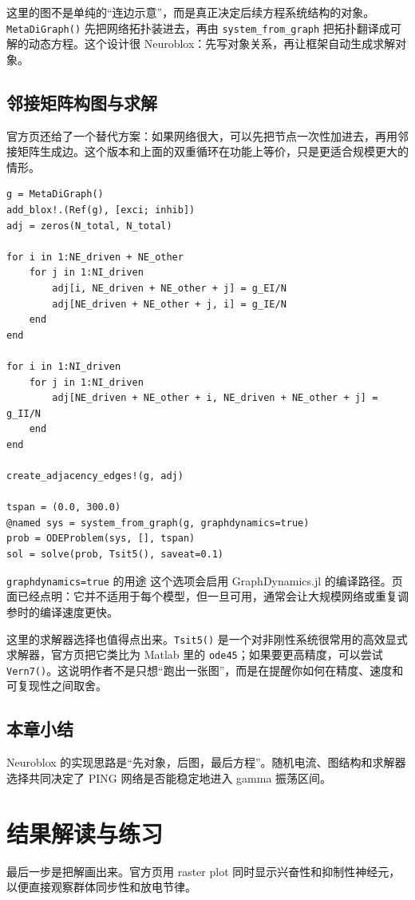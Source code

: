 \documentclass[a4paper]{article}
\begin{document}
这里的图不是单纯的“连边示意”，而是真正决定后续方程系统结构的对象。\texttt{MetaDiGraph()} 先把网络拓扑装进去，再由 \texttt{system\_from\_graph} 把拓扑翻译成可解的动态方程。这个设计很 Neuroblox：先写对象关系，再让框架自动生成求解对象。

\subsection{邻接矩阵构图与求解}
官方页还给了一个替代方案：如果网络很大，可以先把节点一次性加进去，再用邻接矩阵生成边。这个版本和上面的双重循环在功能上等价，只是更适合规模更大的情形。

\begin{lstlisting}[caption={用邻接矩阵一次性生成同样的图并求解},label={lst:ping_sim}]
g = MetaDiGraph()
add_blox!.(Ref(g), [exci; inhib])
adj = zeros(N_total, N_total)

for i in 1:NE_driven + NE_other
    for j in 1:NI_driven
        adj[i, NE_driven + NE_other + j] = g_EI/N
        adj[NE_driven + NE_other + j, i] = g_IE/N
    end
end

for i in 1:NI_driven
    for j in 1:NI_driven
        adj[NE_driven + NE_other + i, NE_driven + NE_other + j] = g_II/N
    end
end

create_adjacency_edges!(g, adj)

tspan = (0.0, 300.0)
@named sys = system_from_graph(g, graphdynamics=true)
prob = ODEProblem(sys, [], tspan)
sol = solve(prob, Tsit5(), saveat=0.1)
\end{lstlisting}

\begin{importantbox}{\texttt{graphdynamics=true} 的用途}
这个选项会启用 GraphDynamics.jl 的编译路径。页面已经点明：它并不适用于每个模型，但一旦可用，通常会让大规模网络或重复调参时的编译速度更快。
\end{importantbox}

这里的求解器选择也值得点出来。\texttt{Tsit5()} 是一个对非刚性系统很常用的高效显式求解器，官方页把它类比为 Matlab 里的 \texttt{ode45}；如果要更高精度，可以尝试 \texttt{Vern7()}。这说明作者不是只想“跑出一张图”，而是在提醒你如何在精度、速度和可复现性之间取舍。

\subsection{本章小结}
Neuroblox 的实现思路是“先对象，后图，最后方程”。随机电流、图结构和求解器选择共同决定了 PING 网络是否能稳定地进入 gamma 振荡区间。

\section{结果解读与练习}
最后一步是把解画出来。官方页用 raster plot 同时显示兴奋性和抑制性神经元，以便直接观察群体同步性和放电节律。
\end{document}
